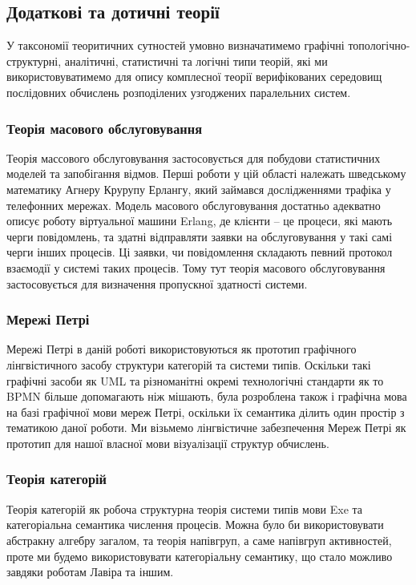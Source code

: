 \documentclass[11pt,oneside]{article}
\begin{document}
\newpage
\subsection{Додаткові та дотичні теорії}
\vspace{0.5cm}
   У таксономії теоритичних сутностей умовно визначатимемо
   графічні топологічно- структурні, аналітичні, статистичні та логічні типи теорій, які
   ми використовуватимемо для опису комплесної теорії верифікованих середовищ
   послідовних обчислень розподілених узгоджених паралельних систем.\\

   \subsubsection{Теорія масового обслуговування}
   Теорія массового обслуговування застосовується для побудови
   статистичних моделей та запобігання відмов. Перші роботи у цій області
   належать шведському математику Агнеру Крурупу Ерлангу, який займався
   дослідженнями трафіка у телефонних мережах. Модель масового обслуговування достатньо
   адекватно описує роботу віртуальної машини Erlang, де клієнти -- це процеси,
   які мають черги повідомлень, та здатні відправляти заявки на обслуговування
   у такі самі черги інших процесів. Ці заявки, чи повідомлення складають певний
   протокол взаємодії у системі таких процесів. Тому тут теорія масового обслуговування
   застосовується для визначення пропускної здатності системи.

   \subsubsection{Мережі Петрі}
   Мережі Петрі в даній роботі використовуються як прототип графічного
   лінгвістичного засобу структури категорій та системи типів. Оскільки
   такі графічні засоби як UML та різноманітні окремі технологічні
   стандарти як то BPMN більше допомагають ніж мішають, була розроблена
   також і графічна мова на базі графічної мови мереж Петрі, оскільки їх
   семантика ділить один простір з тематикою даної роботи. Ми візьмемо
   лінгвістичне забезпечення Мереж Петрі як прототип для нашої власної
   мови візуалізації структур обчислень.

   \subsubsection{Теорія категорій}
   Теорія категорій як робоча структурна теорія системи типів мови Exe та
   категоріальна семантика числення процесів. Можна було би використовувати абстракну алгебру загалом,
   та теорія напівгруп, а саме напівгруп активностей, проте ми будемо використовувати
   категоріальну семантику, що стало можливо завдяки роботам Лавіра та іншим.\\
\end{document}
